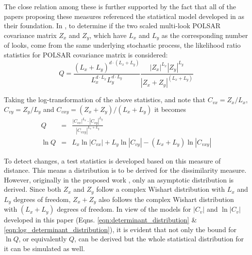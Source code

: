 \documentclass[journal]{IEEEtran}
\begin{document}
The close relation among these is further supported by the fact that
all of the papers proposing these measures referenced the statistical model developed in \cite{Conradsen_2003_TGRS_4} as their foundation.
In \cite{Conradsen_2003_TGRS_4}, to determine if the two scaled multi-look POLSAR covariance matrix $Z_x$ and $Z_y$,
  which have $L_x$ and $L_y$ as the corresponding number of looks,
  come from the same underlying stochastic process,
the likelihood ratio statistics for POLSAR covariance matrix is considered:  
\begin{equation*}
  Q = \frac{(L_x+L_y)^{d \cdot (L_x+L_y)}}{L_x^{d \cdot L_x} L_y^{d \cdot L_y}} \frac{|Z_x|^{L_x} |Z_y|^{L_y} }{|Z_x+Z_y|^{(L_x+L_y)}}
\end{equation*}

Taking the log-transformation of the above statistics, and note that $C_{vx} = Z_x / L_x$, $C_{vy} = Z_y / L_y$ and $C_{vxy} = (Z_x + Z_y)/(L_x + L_y)$ it becomes 
\begin{eqnarray}
  Q &=& \frac{|C_{vx}|^{L_x} \cdot |C_{vy}|^{L_y} }{|C_{vxy}|^{L_x + L_y}} \label{eqn:ori_likelyhood_stats} \\
  \ln Q &=& L_x \ln |C_{vx}| + L_y \ln |C_{vy}| - (L_x + L_y) \ln |C_{vxy}| \label{eqn:log_likelyhood_stats}
\end{eqnarray}

To detect changes, a test statistics is developed based on this measure of distance.
This means a distribution is to be derived for the dissimilarity measure.
However, originally in the proposed work \cite{Conradsen_2003_TGRS_4}, only an asymptotic distribution is derived.
Since both $Z_x$ and $Z_y$ follow a complex Wishart distribution with $L_x$ and $L_y$ degrees of freedom,
  $Z_x+Z_y$ also follows the complex Wishart distribution with $(L_x + L_y)$ degrees of freedom.
In view of the models for $|C_v|$ and $\ln|C_v|$ developed in this paper (Eqns. \ref{eqn:determinant_distribution} \& \ref{eqn:log_determinant_distribution}),
  it is evident that not only the bound for $\ln Q$, or equivalently $Q$, can be derived
  but the whole statistical distribution for it can be simulated as well.
\end{document}
